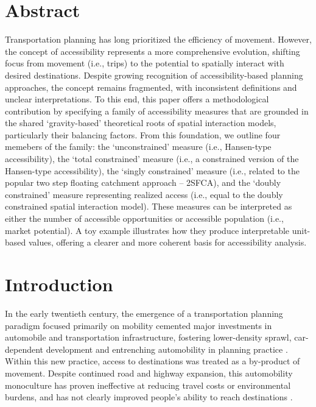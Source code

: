 \documentclass[
  10pt,
  letterpaper,
]{article}
\begin{document}
\section*{Abstract}
Transportation planning has long prioritized the efficiency of movement.
However, the concept of accessibility represents a more comprehensive
evolution, shifting focus from movement (i.e., trips) to the potential
to spatially interact with desired destinations. Despite growing
recognition of accessibility-based planning approaches, the concept
remains fragmented, with inconsistent definitions and unclear
interpretations. To this end, this paper offers a methodological
contribution by specifying a family of accessibility measures that are
grounded in the shared `gravity-based' theoretical roots of spatial
interaction models, particularly their balancing factors. From this
foundation, we outline four memebers of the family: the `unconstrained'
measure (i.e., Hansen-type accessibility), the `total constrained'
measure (i.e., a constrained version of the Hansen-type accessibility),
the `singly constrained' measure (i.e., related to the popular two step
floating catchment approach -- 2SFCA), and the `doubly constrained'
measure representing realized access (i.e., equal to the doubly
constrained spatial interaction model). These measures can be
interpreted as either the number of accessible opportunities or
accessible population (i.e., market potential). A toy example
illustrates how they produce interpretable unit-based values, offering a
clearer and more coherent basis for accessibility analysis.


\linenumbers
\section{Introduction}\label{introduction}

In the early twentieth century, the emergence of a transportation
planning paradigm focused primarily on mobility cemented major
investments in automobile and transportation infrastructure, fostering
lower-density sprawl, car-dependent development and entrenching
automobility in planning practice
\citep{miller_collaborative_2011, lavery_driving_2013}. Within this new
practice, access to destinations was treated as a by-product of
movement. Despite continued road and highway expansion, this
automobility monoculture has proven ineffective at reducing travel costs
or environmental burdens, and has not clearly improved people's ability
to reach destinations
\citep{farber_running_2011, handyACCESSIBILITYVSMOBILITYENHANCING2002, paez_healthcare_2010}.
\end{document}
